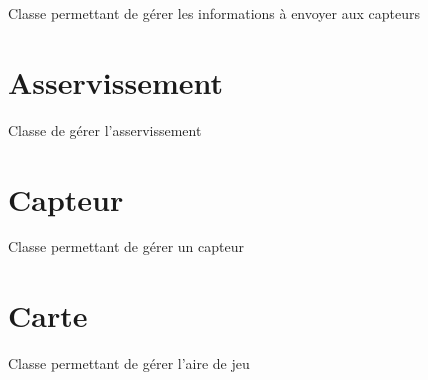 \documentclass[letterpaper,10pt,french]{sphinxmanual}
\begin{document}
\begin{fulllineitems}
\label{actions:lib.actions_out.capteurs_out.Capteurs_out}
Classe permettant de gérer les informations à envoyer aux capteurs

\end{fulllineitems}



\chapter{Asservissement}
\label{asservissement:asservissement}\label{asservissement::doc}\label{asservissement:module-lib.asservissement}

\begin{fulllineitems}
\label{asservissement:lib.asservissement.Asservissement}
Classe de gérer l'asservissement

\end{fulllineitems}



\chapter{Capteur}
\label{capteur:module-lib.capteur}\label{capteur::doc}\label{capteur:capteur}

\begin{fulllineitems}
\label{capteur:lib.capteur.Capteur}
Classe permettant de gérer un capteur

\end{fulllineitems}



\chapter{Carte}
\label{carte:module-lib.carte}\label{carte::doc}\label{carte:carte}

\begin{fulllineitems}
\label{carte:lib.carte.Carte}
Classe permettant de gérer l'aire de jeu

\end{fulllineitems}
\end{document}
